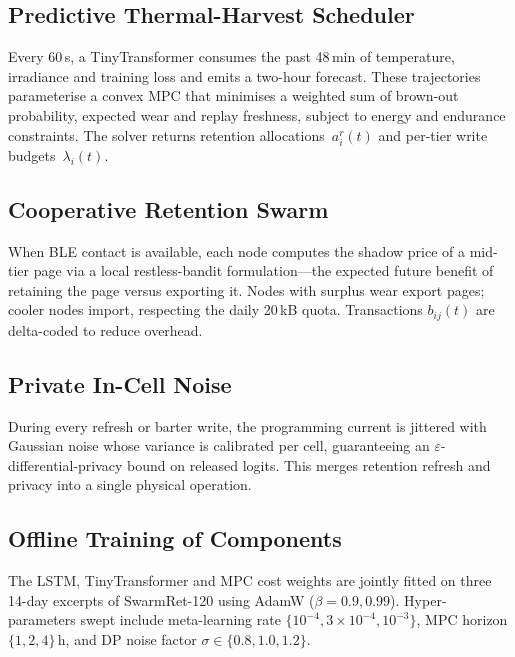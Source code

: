\documentclass{article}
\begin{document}
\subsection{Predictive Thermal-Harvest Scheduler}
Every 60\,s, a TinyTransformer consumes the past 48\,min of temperature, irradiance and training loss and emits a two-hour forecast. These trajectories parameterise a convex MPC that minimises a weighted sum of brown-out probability, expected wear and replay freshness, subject to energy and endurance constraints. The solver returns retention allocations~$a_{i}^{r}(t)$ and per-tier write budgets~$\lambda_{i}(t)$.

\subsection{Cooperative Retention Swarm}
When BLE contact is available, each node computes the shadow price of a mid-tier page via a local restless-bandit formulation—the expected future benefit of retaining the page versus exporting it. Nodes with surplus wear export pages; cooler nodes import, respecting the daily 20\,kB quota. Transactions $b_{ij}(t)$ are delta-coded to reduce overhead.

\subsection{Private In-Cell Noise}
During every refresh or barter write, the programming current is jittered with Gaussian noise whose variance is calibrated per cell, guaranteeing an $\varepsilon$-differential-privacy bound on released logits. This merges retention refresh and privacy into a single physical operation.

\subsection{Offline Training of Components}
The LSTM, TinyTransformer and MPC cost weights are jointly fitted on three 14-day excerpts of SwarmRet-120 using AdamW ($\beta=0.9,0.99$). Hyper-parameters swept include meta-learning rate $\{10^{-4},3\times10^{-4},10^{-3}\}$, MPC horizon $\{1,2,4\}$\,h, and DP noise factor $\sigma\in\{0.8,1.0,1.2\}$.
\end{document}

